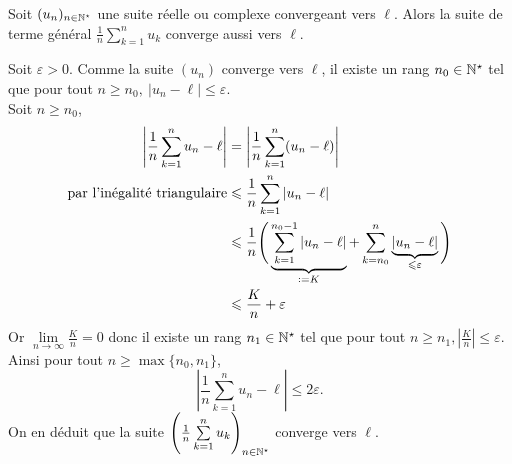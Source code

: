 \begin{lemme}
    Soit $(u_n)_{n \in \mathbb{N}^\star}$ une suite réelle ou complexe convergeant vers $\ell$.
    Alors la suite de terme général $\frac{1}{n} \sum\limits_{k=1}^{n} u_k$ converge aussi vers $\ell$.
\end{lemme}

\begin{preuve}
    Soit $\varepsilon > 0$. Comme la suite $(u_n)$ converge vers $\ell$, il existe un rang $n_0 \in \mathbb{N}^\star$ tel que pour tout $n \geqslant n_0,\ |u_n - \ell| \leqslant \varepsilon$. \\
    Soit $n \geqslant n_0$,
    \begin{align*}
        \left| \frac{1}{n} \sum_{k=1}^n u_n - \ell \right| &= \left| \frac{1}{n} \sum_{k=1}^n (u_n - \ell) \right| \\
        \text{par l'inégalité triangulaire} &\leqslant \frac{1}{n} \sum_{k=1}^n |u_n - \ell| \\
        &\leqslant \frac{1}{n} \Bigg( \underbrace{\sum_{k=1}^{n_0-1} |u_n - \ell|}_{\defeq K} + \sum_{k=n_0}^n \underbrace{|u_n - \ell|}_{\leqslant \varepsilon} \Bigg) \\
        &\leqslant \frac{K}{n} + \varepsilon
    \end{align*}
    Or $\lim\limits_{n \to \infty} \frac{K}{n} = 0$ donc il existe un rang $n_1 \in \mathbb{N}^\star$ tel que pour tout $n \geqslant n_1, \left| \frac{K}{n} \right| \leqslant \varepsilon$. \\
    Ainsi pour tout $n \geqslant \max \{ n_0, n_1 \}$, 
    $$\left| \frac{1}{n} \sum_{k=1}^n u_n - \ell \right| \leqslant 2 \varepsilon.$$
    On en déduit que la suite $\Bigg( \frac{1}{n} \sum\limits_{k=1}^{n} u_k \Bigg)_{n \in \mathbb{N}^\star}$ converge vers $\ell$.
\end{preuve}